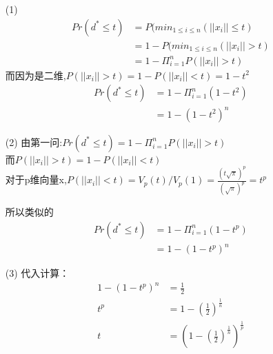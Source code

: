 \documentclass[11pt, a4paper, UTF8]{ctexart}
\begin{document}
\begin{solution}
	\begin{enumerate}
		\item[(1)] \begin{equation}
		\begin{aligned}
			Pr(d^* \leq t)	&=P(min_{1\leq i\leq n}(||x_i||\leq t)\\
										&=1-P(min_{1\leq i\leq n}(||x_i||> t)\\
										&=1-\Pi_{i=1}^{n}P(||x_i||>t)
		\end{aligned}			
		\end{equation}
		而因为是二维,$P(||x_i||>t)=1-P(||x_i||<t)=1-t^2$
		\begin{equation}
			\begin{aligned}
				Pr(d^* \leq t)	
											&=1-\Pi_{i=1}^{n}(1-t^2)\\
											&=1-(1-t^2)^n
			\end{aligned}			
			\end{equation}
	\item[(2)]
	 由第一问:$Pr(d^* \leq t)=1-\Pi_{i=1}^{n}P(||x_i||>t)$
\\	而$P(||x_i||>t)=1-P(||x_i||<t)$\\
对于p维向量x,$P(||x_i||<t)=V_p(t)/V_p(1)=\frac{(t\sqrt{\pi})^p}{(\sqrt{\pi})^p}=t^p$

所以类似的\begin{equation}
	\begin{aligned}
		Pr(d^* \leq t)	
									&=1-\Pi_{i=1}^{n}(1-t^p)\\
									&=1-(1-t^p)^n
	\end{aligned}			
	\end{equation}

\item [(3)]代入计算：\begin{equation}
\begin{aligned}
	1-(1-t^p)^n	&=\frac{1}{2}
	\\t^p&=1-(\frac{1}{2})^{\frac{1}{n}}\\
	t&=(1-(\frac{1}{2})^{\frac{1}{n}})^{\frac{1}{p}}
\end{aligned}			
\end{equation}

	\end{enumerate}
\end{solution}
\begin{remark}

	
\end{remark}
\end{document}
